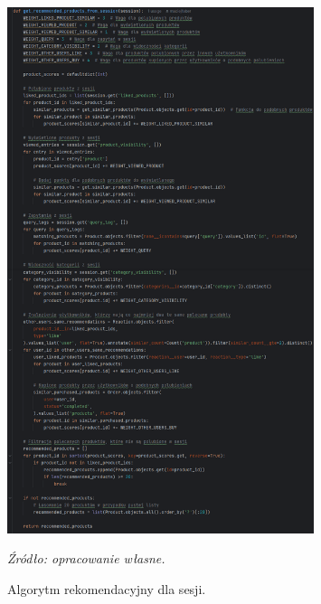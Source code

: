 \documentclass[12pt,a4paper,oneside]{article}
\theoremstyle{definition}
\numberwithin{equation}{section}
\begin{document}
\begin{figure}[H]
    \centering
    \includegraphics[width=0.8\textwidth]{images/krzysztofBImages/session_recommendations.png}
    \caption{Algorytm rekomendacyjny dla sesji.}
    \emph{Źródło: opracowanie własne.}
    \label{fig:session_recommendations}
\end{figure}
%
%
\end{document}
